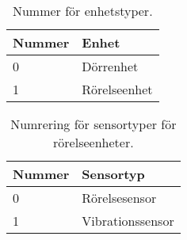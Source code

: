 \begin{table}[htb]
	\centering
	\begin{tabular}{|l|l|}
		\hline
		Nummer & Enhet \\ \hline \hline
		0 & Dörrenhet \\ \hline
		1 & Rörelseenhet \\ \hline

	\end{tabular}
	\caption{Nummer för enhetstyper.}
	\label{tab:enhetstyper}
\end{table}


\begin{table}[htb]
	\centering
	\begin{tabular}{|l|l|}
		\hline
		Nummer & Sensortyp \\ \hline \hline
		0 & Rörelsesensor \\ \hline
		1 & Vibrationssensor \\ \hline

	\end{tabular}
	\caption{Numrering för sensortyper för rörelseenheter.}
	\label{tab:sensortyper}
\end{table}
